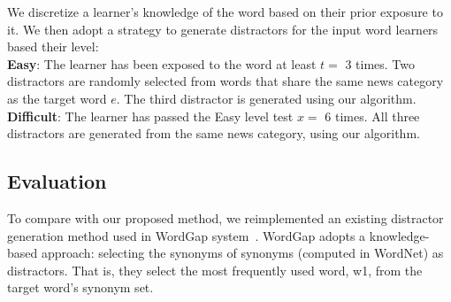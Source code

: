 
We discretize a learner's knowledge of the word based on their prior
exposure to it.  We then adopt a strategy to generate distractors for
the input word learners based their level: \\

{\bf Easy}: The learner has been exposed to the word at least $t=$ 3
times.  Two distractors are randomly selected from words that share
the same news category as the target word $e$. The third distractor is
generated using our algorithm. \\

{\bf Difficult}: The learner has passed the Easy level test $x=$ 6
times.  All three distractors are generated from the same news
category, using our algorithm.


\subsection{Evaluation}

To compare with our proposed method, we reimplemented an existing distractor generation method used in WordGap system~\cite{Knoop2013}. WordGap adopts a knowledge-based approach: selecting the synonyms of synonyms (computed in WordNet) as distractors. That is, they select the most frequently used word, w1, from the target word's synonym set. 

